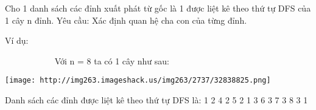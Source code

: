 Cho 1 danh sách các đỉnh xuất phát từ gốc là 1 được liệt kê theo thứ tự DFS của 1 cây n đỉnh. Yêu cầu: Xác định quan hệ cha con của từng đỉnh.

Ví dụ:

            Với n = 8 ta có 1 cây như sau:


\texttt{[image: http://img263.imageshack.us/img263/2737/32838825.png]}

Danh sách các đỉnh được liệt kê theo thứ tự DFS là: 1 2 4 2 5 2 1 3 6 3 7 3 8 3 1